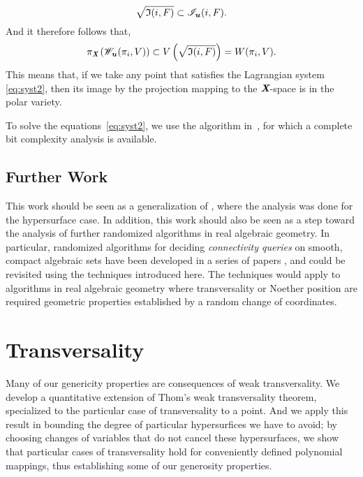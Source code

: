 \documentclass[a4paper]{article}
\def\Xb{\textit{\textbf{X}}}
\def\ub{{\bm u}}
\def\Ii{\mathfrak{I}(i,F)}
\def\Iil{\mathscr{I}_{\ub}(i,F)}
\def\Wil{\mathscr{W}_{\ub}(\pi_i,V)}
\begin{document}
    \[
    \sqrt{\frak{I}(i,F)} \subset \Iil.
    \]
And it therefore follows that, 
\[
\pi_{\Xb}\left(\Wil\right) \subset V\left(\sqrt{\Ii}\right) = W(\pi_i,V).
\]
This means that, if we take any point that satisfies the Lagrangian system \eqref{eq:syst2}, then its image by the projection mapping to the $\Xb$-space is in the polar variety. 
\par 
To solve the equations~\eqref{eq:syst2}, we use the algorithm
in~\cite{SH}, for which a complete bit complexity analysis is
available. 



\subsection{Further Work}
This work should be seen as a generalization of \cite{ElGiSh20}, where the analysis was done for the hypersurface case. In addition, this work should also be seen as a step toward the analysis of
further randomized algorithms in real algebraic geometry.  In particular, randomized algorithms for deciding {\em
  connectivity queries} on smooth, compact algebraic sets have been
developed in a series of papers
\cite{SchostMohabBabySteps2011,SchostMohabBabySteps2014}, and could be
revisited using the techniques introduced here. The techniques would apply to algorithms in real algebraic geometry where transversality or Noether position are required geometric properties established by a random change of coordinates.



\section{Transversality}
Many of our genericity properties are consequences of weak transversality. We develop a quantitative extension of Thom’s weak transversality theorem, specialized to the particular case of transversality to a point. And we apply this result in bounding the degree of particular hypersurfices we have to avoid; by choosing changes of variables that do not cancel these hypersurfaces, we show that particular cases of transversality hold for conveniently defined polynomial mappings, thus establishing some of our generosity properties.  
\end{document}
